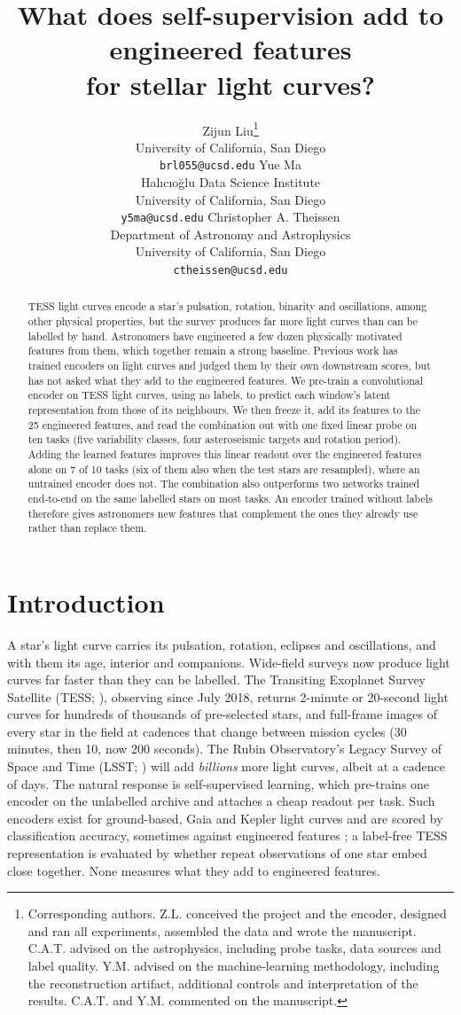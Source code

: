 \documentclass{article}
\title{What does self-supervision add to engineered features\\for stellar light curves?}
\author{%
  Zijun Liu\thanks{Corresponding authors. Z.L. conceived the project and the encoder, designed and
  ran all experiments, assembled the data and wrote the manuscript. C.A.T. advised on the
  astrophysics, including probe tasks, data sources and label quality. Y.M. advised on the machine-learning methodology, including the
  reconstruction artifact, additional controls and interpretation of the results. C.A.T. and Y.M.
  commented on the manuscript.}\\
  University of California, San Diego\\
  \texttt{brl055@ucsd.edu}
  \And
  Yue Ma\footnotemark[1]\\
  Hal\i c\i o\u{g}lu Data Science Institute\\
  University of California, San Diego\\
  \texttt{y5ma@ucsd.edu}
  \And
  Christopher A. Theissen\footnotemark[1]\\
  Department of Astronomy and Astrophysics\\
  University of California, San Diego\\
  \texttt{ctheissen@ucsd.edu}
}
\begin{document}
\maketitle

\begin{abstract}
TESS light curves encode a star's pulsation, rotation, binarity and oscillations, among other physical
properties, but the survey
produces far more light curves than can be labelled by hand. Astronomers have engineered a few
dozen physically motivated features from them, which together remain a strong baseline. Previous work has trained
encoders on light curves and judged them by their own downstream scores, but has not asked what
they add to the engineered features. We pre-train a convolutional encoder on TESS light curves, using no labels, to predict each
window's latent representation from those of its neighbours. We then freeze it, add its features to
the 25 engineered features, and read the combination out with one fixed linear probe on ten tasks
(five variability classes, four asteroseismic targets and rotation period). Adding the learned
features improves this linear readout over the engineered features alone on 7 of 10 tasks (six of
them also when the test stars are resampled), where an untrained encoder does not. The combination also outperforms two networks trained end-to-end on the same labelled
stars on most tasks. An encoder trained without labels therefore gives astronomers new features
that complement the ones they already use rather than replace them.
\end{abstract}

\section{Introduction}

A star's light curve carries its pulsation, rotation, eclipses and oscillations, and with them its
age, interior and companions. Wide-field surveys now produce light curves far faster
than they can be labelled. The Transiting Exoplanet Survey Satellite (TESS;
\citealt{ricker2015}), observing since July 2018, returns 2-minute or 20-second \citep{huber2022} light curves for hundreds of
thousands of pre-selected stars, and full-frame images of every star in the field at cadences that
change between mission cycles (30 minutes, then 10, now 200 seconds). The Rubin Observatory's Legacy
Survey of Space and Time (LSST; \citealt{ivezic2019}) will add \emph{billions} more light curves, albeit at a cadence of days. The natural response is
self-supervised learning, which pre-trains one encoder on the unlabelled archive and attaches a cheap
readout per task. Such encoders exist for ground-based, Gaia and Kepler light curves
\citep{donoso2025astromer2,zuo2025falco,rui2026jepa} and are scored by classification accuracy,
sometimes against engineered features \citep{rui2026jepa}; a label-free TESS representation
\citep{poznanski2026} is evaluated by whether repeat observations of one star embed close together.
None measures what they add to engineered features.
\end{document}
